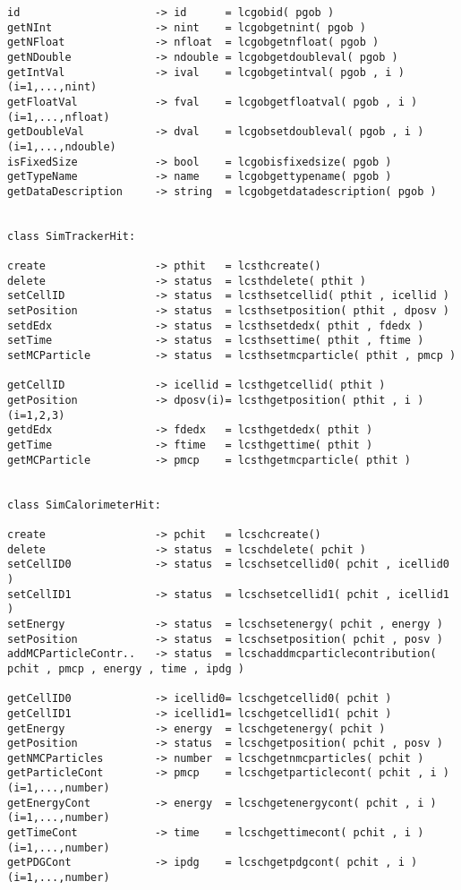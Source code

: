 \begin{scriptsize}
\begin{verbatim}
id                     -> id      = lcgobid( pgob )
getNInt                -> nint    = lcgobgetnint( pgob )
getNFloat              -> nfloat  = lcgobgetnfloat( pgob )
getNDouble             -> ndouble = lcgobgetdoubleval( pgob )
getIntVal              -> ival    = lcgobgetintval( pgob , i )      (i=1,...,nint)
getFloatVal            -> fval    = lcgobgetfloatval( pgob , i )    (i=1,...,nfloat)
getDoubleVal           -> dval    = lcgobsetdoubleval( pgob , i )   (i=1,...,ndouble)
isFixedSize            -> bool    = lcgobisfixedsize( pgob )
getTypeName            -> name    = lcgobgettypename( pgob )
getDataDescription     -> string  = lcgobgetdatadescription( pgob )


class SimTrackerHit:

create                 -> pthit   = lcsthcreate()
delete                 -> status  = lcsthdelete( pthit )
setCellID              -> status  = lcsthsetcellid( pthit , icellid )
setPosition            -> status  = lcsthsetposition( pthit , dposv )
setdEdx                -> status  = lcsthsetdedx( pthit , fdedx )
setTime                -> status  = lcsthsettime( pthit , ftime )
setMCParticle          -> status  = lcsthsetmcparticle( pthit , pmcp )

getCellID              -> icellid = lcsthgetcellid( pthit )
getPosition            -> dposv(i)= lcsthgetposition( pthit , i ) (i=1,2,3)
getdEdx                -> fdedx   = lcsthgetdedx( pthit )
getTime                -> ftime   = lcsthgettime( pthit )
getMCParticle          -> pmcp    = lcsthgetmcparticle( pthit )


class SimCalorimeterHit:

create                 -> pchit   = lcschcreate()
delete                 -> status  = lcschdelete( pchit )
setCellID0             -> status  = lcschsetcellid0( pchit , icellid0 )
setCellID1             -> status  = lcschsetcellid1( pchit , icellid1 )
setEnergy              -> status  = lcschsetenergy( pchit , energy )
setPosition            -> status  = lcschsetposition( pchit , posv )
addMCParticleContr..   -> status  = lcschaddmcparticlecontribution( pchit , pmcp , energy , time , ipdg )

getCellID0             -> icellid0= lcschgetcellid0( pchit )
getCellID1             -> icellid1= lcschgetcellid1( pchit )
getEnergy              -> energy  = lcschgetenergy( pchit )
getPosition            -> status  = lcschgetposition( pchit , posv )
getNMCParticles        -> number  = lcschgetnmcparticles( pchit )
getParticleCont        -> pmcp    = lcschgetparticlecont( pchit , i ) (i=1,...,number)
getEnergyCont          -> energy  = lcschgetenergycont( pchit , i )   (i=1,...,number)
getTimeCont            -> time    = lcschgettimecont( pchit , i )     (i=1,...,number)
getPDGCont             -> ipdg    = lcschgetpdgcont( pchit , i )      (i=1,...,number)



\end{verbatim}
\end{scriptsize}
